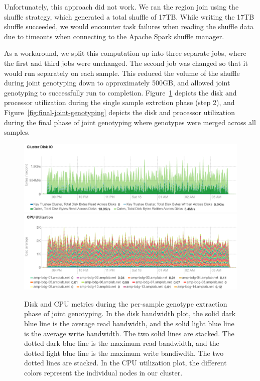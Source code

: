 \documentclass[phd]{ucbthesis}
\begin{document}
Unfortunately, this approach did not work. We ran the region join using the
shuffle strategy, which generated a total shuffle of 17TB.
While writing the 17TB shuffle succeeded, we would encounter task
failures when reading the shuffle data due to timeouts when connecting to the
Apache Spark shuffle manager.

As a workaround, we split this computation up into three separate jobs, where
the first and third jobs were unchanged. The second job was changed so that it
would run separately on each sample. This reduced the volume of the shuffle
during joint genotyping down to approximately 500GB, and allowed joint
genotyping to successfully run to completion. Figure~\ref{fig:extract-joint-genotyping}
depicts the disk and processor utilization during the single sample extrction
phase (step 2), and Figure~\ref{fig:final-joint-genotyping} depicts the disk and
processor utilization during the final phase of joint genotyping where genotypes
were merged across all samples.

\begin{figure}[h]
  \begin{center}
    \includegraphics[width=0.95\linewidth]{graphs/extract-disk.png}
    \includegraphics[width=0.95\linewidth]{graphs/extract-cpu.png}
  \end{center}
  \caption{Disk and CPU metrics during the per-sample genotype extraction phase
    of joint genotyping. In the disk bandwidth plot, the
    solid dark blue line is the average read bandwidth, and the solid light blue
    line is the average write bandwidth. The two solid lines are stacked. The
    dotted dark blue line is the maximum read bandwidth, and the dotted light
    blue line is the maximum write bandiwdth. The two dotted lines are stacked.
    In the CPU utilization plot, the different colors represent the individual
    nodes in our cluster.}
  \label{fig:extract-joint-genotyping}
\end{figure}
\end{document}
